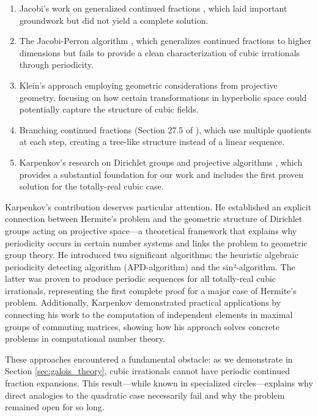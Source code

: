 \begin{enumerate}
    \item Jacobi's work on generalized continued fractions \cite{Jacobi1868}, which laid important groundwork but did not yield a complete solution.
    
    \item The Jacobi-Perron algorithm \cite{Perron1907}, which generalizes continued fractions to higher dimensions but fails to provide a clean characterization of cubic irrationals through periodicity.
    
    \item Klein's approach employing geometric considerations from projective geometry, focusing on how certain transformations in hyperbolic space could potentially capture the structure of cubic fields.
    
    \item Branching continued fractions (Section 27.5 of \cite{KarpenkovBook}), which use multiple 
    quotients at each step, creating a tree-like structure instead of a linear sequence.
    
    \item Karpenkov's research on Dirichlet groups and projective algorithms \cite{Karpenkov2022}, which provides a substantial foundation for our work and includes the first proven solution for the totally-real cubic case.
\end{enumerate}

Karpenkov's contribution deserves particular attention. He established an explicit connection between Hermite's problem and the geometric structure of Dirichlet groups acting on projective space—a theoretical framework that explains why periodicity occurs in certain number systems and links the problem to geometric group theory. He introduced two significant algorithms: the heuristic algebraic periodicity detecting algorithm (APD-algorithm) and the sin²-algorithm. The latter was proven \cite{Karpenkov2019} to produce periodic sequences for all totally-real cubic irrationals, representing the first complete proof for a major case of Hermite's problem. Additionally, Karpenkov demonstrated practical applications by connecting his work to the computation of independent elements in maximal groups of commuting matrices, showing how his approach solves concrete problems in computational number theory.

These approaches encountered a fundamental obstacle: as we demonstrate in Section \ref{sec:galois_theory}, cubic irrationals cannot have periodic continued fraction expansions. This result—while known in specialized circles—explains why direct analogies to the quadratic case necessarily fail and why the problem remained open for so long.


